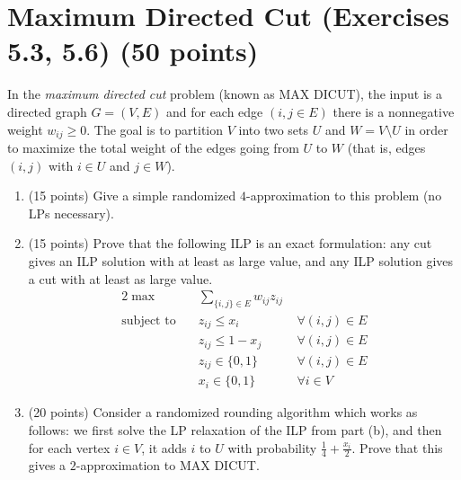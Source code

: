 \documentclass[11pt]{article}
\begin{document}
\section{Maximum Directed Cut (Exercises 5.3, 5.6) (50 points)}
In the \emph{maximum directed cut} problem (known as MAX DICUT), the input is a directed graph $G = (V, E)$ and for each edge $(i,j \in E)$ there is a nonnegative weight $w_{ij} \geq 0$.  The goal is to partition $V$ into two sets $U$ and $W = V \setminus U$ in order to maximize the total weight of the edges going from $U$ to $W$ (that is, edges $(i,j)$ with $i \in U$ and $j \in W$).

\begin{enumerate}
\item (15 points) Give a simple randomized $4$-approximation to this problem (no LPs necessary).  


\item (15 points) Prove that the following ILP is an exact formulation: any cut gives an ILP solution with at least as large value, and any ILP solution gives a cut with at least as large value.  
\begin{alignat*}{2}
\max  \quad & \sum_{\{i,j\} \in E} w_{ij} z_{ij} \\
\text{subject to} \quad & z_{ij} \leq x_i \qquad & \forall (i,j) \in E  \\
& z_{ij} \leq 1-x_j  \qquad& \forall (i,j) \in E \\
& z_{ij} \in \{0,1\} & \forall (i,j) \in E \\
&x_i \in \{0,1\} & \forall i \in V
\end{alignat*} 

\item (20 points) Consider a randomized rounding algorithm which works as follows: we first solve the LP relaxation of the ILP from part (b), and then for each vertex $i \in V$, it adds $i$ to $U$ with probability $\frac{1}{4} + \frac{x_i}{2}$.  Prove that this gives a $2$-approximation to MAX DICUT.  

\end{enumerate}
\end{document}
